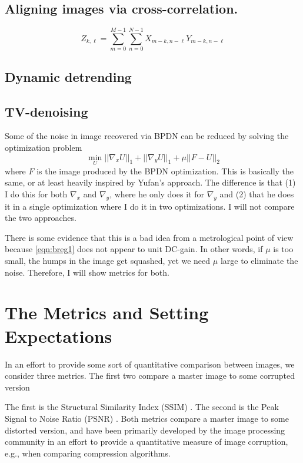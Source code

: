 \documentclass[11pt]{article}
\begin{document}
\subsection{Aligning images via cross-correlation.}
\begin{equation}
  Z_{k,\ell} = \sum_{m=0}^{M-1}\sum_{n=0}^{N-1} X_{m-k, n-\ell}Y_{m-k, n-\ell}
\end{equation}
\subsection{Dynamic detrending}


\subsection{ TV-denoising}
Some of the noise in image recovered via BPDN can be reduced by solving the optimization problem
\begin{equation}
  \min_{U} ||\nabla_xU||_1 + ||\nabla_yU||_1 + \mu||F - U||_2 \label{eqn:breg1}
\end{equation}
where $F$ is the image produced by the BPDN optimization. 
This is basically the same, or at least heavily inspired by Yufan's approach. The difference is that (1) I do this for both $\nabla_x$ and $\nabla_y$, where he only does it for $\nabla_y$ and (2) that he does it in a single optimization where I do it in two optimizations. I will not compare the two approaches.

There is some evidence that this is a bad idea from a metrological point of view because \eqref{eqn:breg1} does not appear to unit DC-gain. In other words, if $\mu$ is too small, the humps in the image get squashed, yet we need $\mu$ large to eliminate the noise. Therefore, I will show metrics for both.

\section{The Metrics and Setting Expectations}
In an effort to provide some sort of quantitative comparison between images, we consider three metrics. The first two compare a master image to some corrupted version

The first is the Structural Similarity Index (SSIM) \cite{wang_image_2004}. The second is the Peak Signal to Noise Ratio (PSNR) \cite{Luo_nano_2015}. Both metrics compare a master image to some distorted version, and have been primarily developed by the image processing community in an effort to provide a quantitative measure of image corruption, e.g., when comparing compression algorithms.
\end{document}
